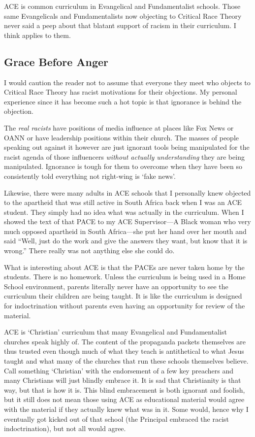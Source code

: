 ACE is common curriculum in Evangelical and Fundamentalist schools. Those same Evangelicals and Fundamentalists now objecting to Critical Race Theory never said a peep about that blatant support of racism in their curriculum. I think  applies to them.

\subsection{Grace Before Anger}

I would caution the reader not to assume that everyone they meet who objects to Critical Race Theory has racist motivations for their objections. My personal experience since it has become such a hot topic is that ignorance is behind the objection.

The \emph{real racists} have positions of media influence at places like Fox News or OANN or have leadership positions within their church. The masses of people speaking out against it however are just ignorant tools being manipulated for the racist agenda of those influencers \emph{without actually understanding} they are being manipulated. Ignorance is tough for them to overcome when they have been so consistently told everything not right-wing is `fake news'.

Likewise, there were many adults in ACE schools that I personally knew objected to the apartheid that was still active in South Africa back when I was an ACE student. They simply had no idea what was actually in the curriculum. When I showed the text of that PACE to my ACE Supervisor---A Black woman who very much opposed apartheid in South Africa---she put her hand over her mouth and said ``Well, just do the work and give the answers they want, but know that it is wrong.'' There really was not anything else she could do.

What is interesting about ACE is that the PACEs are never taken home by the students. There is no homework. Unless the curriculum is being used in a Home School environment, parents literally never have an opportunity to see the curriculum their children are being taught. It is like the curriculum is designed for indoctrination without parents even having an opportunity for review of the material.

ACE is `Christian' curriculum that many Evangelical and Fundamentalist churches speak highly of. The content of the propaganda packets themselves are thus trusted even though much of what they teach is antithetical to what Jesus taught and what many of the churches that run these schools themselves believe. Call something `Christian' with the endorsement of a few key preachers and many Christians will just blindly embrace it. It is sad that Christianity is that way, but that is how it is. This blind embracement is both ignorant and foolish, but it still does not mean those using ACE as educational material would agree with the material if they actually knew what was in it. Some would, hence why I eventually got kicked out of that school (the Principal embraced the racist indoctrination), but not all would agree.

